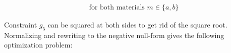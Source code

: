 	\begin{table}[H]
\end{table}
\vspace{-8mm}
\begin{align*}
	& \text{for both materials } m \in \{a, b\} \nonumber 
\end{align*}
	


Constraint $g_5$ can be squared at both sides to get rid of the square root. Normalizing and rewriting to the negative null-form gives the following optimization problem:


